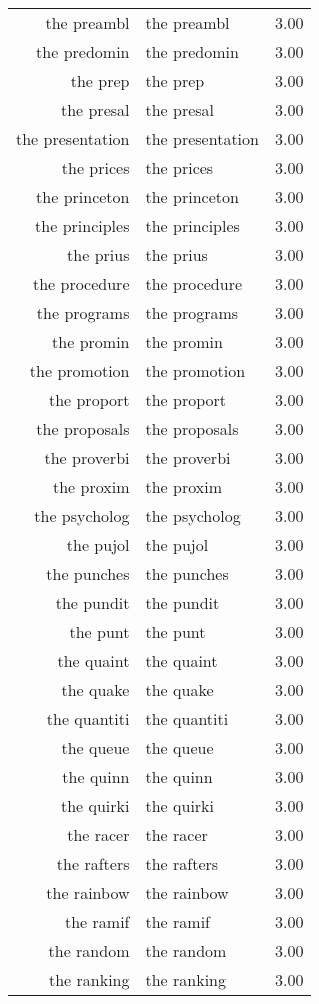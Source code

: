 \begin{table}[ht]
\begin{tabular}{rlr}
  the preambl & the preambl & 3.00 \\ 
  the predomin & the predomin & 3.00 \\ 
  the prep & the prep & 3.00 \\ 
  the presal & the presal & 3.00 \\ 
  the presentation & the presentation & 3.00 \\ 
  the prices & the prices & 3.00 \\ 
  the princeton & the princeton & 3.00 \\ 
  the principles & the principles & 3.00 \\ 
  the prius & the prius & 3.00 \\ 
  the procedure & the procedure & 3.00 \\ 
  the programs & the programs & 3.00 \\ 
  the promin & the promin & 3.00 \\ 
  the promotion & the promotion & 3.00 \\ 
  the proport & the proport & 3.00 \\ 
  the proposals & the proposals & 3.00 \\ 
  the proverbi & the proverbi & 3.00 \\ 
  the proxim & the proxim & 3.00 \\ 
  the psycholog & the psycholog & 3.00 \\ 
  the pujol & the pujol & 3.00 \\ 
  the punches & the punches & 3.00 \\ 
  the pundit & the pundit & 3.00 \\ 
  the punt & the punt & 3.00 \\ 
  the quaint & the quaint & 3.00 \\ 
  the quake & the quake & 3.00 \\ 
  the quantiti & the quantiti & 3.00 \\ 
  the queue & the queue & 3.00 \\ 
  the quinn & the quinn & 3.00 \\ 
  the quirki & the quirki & 3.00 \\ 
  the racer & the racer & 3.00 \\ 
  the rafters & the rafters & 3.00 \\ 
  the rainbow & the rainbow & 3.00 \\ 
  the ramif & the ramif & 3.00 \\ 
  the random & the random & 3.00 \\ 
  the ranking & the ranking & 3.00 \\ 

\end{tabular}
\end{table}
